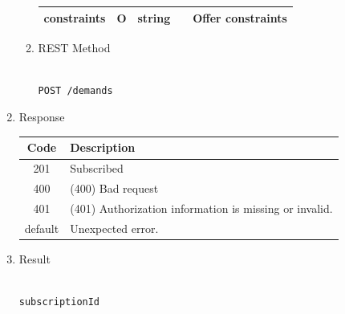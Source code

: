 \begin{enumerate}
\begin{enumerate}
\begin{table}[H]
\begin{center}
\begin{tabular}{|p{3cm}|l|p{3cm}|p{3cm}|p{4cm}|}
\hline

constraints	& O	& 	string	&		&	Offer constraints \\ 

\hline

\end{tabular}
\end{center}

\end{table}

\item REST Method

\begin{tcolorbox}[boxrule=0pt, frame empty]
\begin{verbatim} 

POST /demands

\end{verbatim}
\end{tcolorbox}

\end{enumerate}

\item Response

\begin{table}[H]
\footnotesize

\begin{center}
\begin{tabular}{|c|l|} 
\hline
\rowcolor{lightgray}	Code 		& 	Description \\
\hline
201	 		&	Subscribed \\
\hline
400			&	(400) Bad request \\
\hline
401			&	(401) Authorization information is missing or invalid. \\
\hline
default		&	Unexpected error. \\
\hline
\end{tabular}
\end{center}

\end{table}

\item Result

\begin{tcolorbox}[boxrule=0pt, frame empty]
\begin{verbatim}

subscriptionId

\end{verbatim}
\end{tcolorbox}

\begin{table}[H]
\footnotesize


\end{table}
\end{enumerate}
